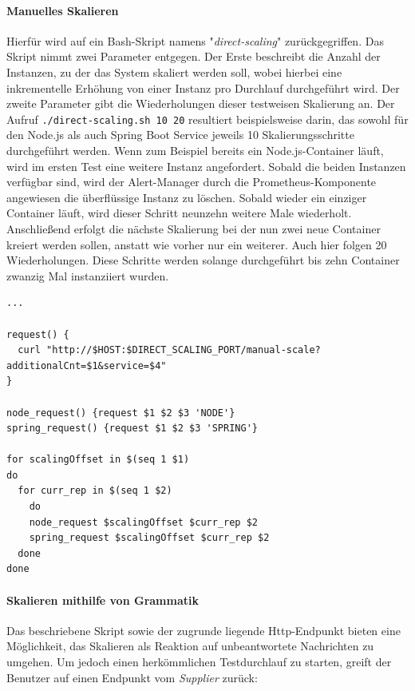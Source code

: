 \label{erklaerungDirScal}
\paragraph{Manuelles Skalieren}
Hierfür wird auf ein Bash-Skript namens "\emph{direct-scaling}" zurückgegriffen. Das Skript nimmt zwei Parameter entgegen. Der Erste beschreibt die Anzahl der Instanzen, zu der das System skaliert werden soll, wobei hierbei eine inkrementelle Erhöhung von einer Instanz pro Durchlauf durchgeführt wird. Der zweite Parameter gibt die Wiederholungen dieser testweisen Skalierung an. Der Aufruf \verb+./direct-scaling.sh 10 20+ resultiert beispielsweise darin, das sowohl für den Node.js als auch Spring Boot Service jeweils 10 Skalierungsschritte durchgeführt werden. Wenn zum Beispiel bereits ein Node.js-Container läuft, wird im ersten Test eine weitere Instanz angefordert. Sobald die beiden Instanzen verfügbar sind, wird der Alert-Manager durch die Prometheus-Komponente angewiesen die überflüssige Instanz zu löschen. Sobald wieder ein einziger Container läuft, wird dieser Schritt neunzehn weitere Male wiederholt. Anschließend erfolgt die nächste Skalierung bei der nun zwei neue Container kreiert werden sollen, anstatt wie vorher nur ein weiterer. Auch hier folgen 20 Wiederholungen. Diese Schritte werden solange durchgeführt bis zehn Container zwanzig Mal instanziiert wurden.

\label{lst:direct-scaling}
\begin{minipage}{\linewidth}
\begin{lstlisting}[caption={direct-scaling},style=bashStyle]
...

request() {
  curl "http://$HOST:$DIRECT_SCALING_PORT/manual-scale?additionalCnt=$1&service=$4"
}

node_request() {request $1 $2 $3 'NODE'}
spring_request() {request $1 $2 $3 'SPRING'}

for scalingOffset in $(seq 1 $1)
do 
  for curr_rep in $(seq 1 $2)
	do 
    node_request $scalingOffset $curr_rep $2
    spring_request $scalingOffset $curr_rep $2
  done
done
\end{lstlisting}
\end{minipage}
\paragraph{Skalieren mithilfe von Grammatik}
Das beschriebene Skript sowie der zugrunde liegende Http-Endpunkt bieten eine Möglichkeit, das Skalieren als Reaktion auf unbeantwortete Nachrichten zu umgehen. Um jedoch einen herkömmlichen Testdurchlauf zu starten, greift der Benutzer auf einen Endpunkt vom \emph{Supplier} zurück: 

